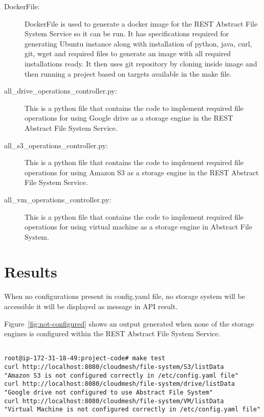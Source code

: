 \begin{description}
\item[DockerFile:]


  DockerFile is used to generate a docker image for the REST Abstract
  File System Service so it can be run.  It has specifications required for
  generating Ubuntu instance along with installation of python, java,
  curl, git, wget and required files to generate an image with all
  required installations ready. It then uses git repository by cloning
  inside image and then running a project based on targets available
  in the make file.

\item[all\_drive\_operations\_controller.py:] This is a python file
  that contains the code to implement required file operations for
  using Google drive as a storage engine in the REST Abstract File
  System Service.

\item[all\_s3\_operations\_controller.py:] This is a python file that
  contains the code to implement required file operations for using
  Amazon S3 as a storage engine in the REST Abstract File System
  Service.

\item[all\_vm\_operations\_controller.py:]

This is a python file that contains the code to implement required file 
operations for using virtual machine as a storage engine in Abstract File 
System. 

\end{description}



\section{Results}

When no configurations present in config.yaml file, no storage 
system will be accessible it will be displayed as message in 
API result.


Figure~\ref{fig:not-configured} shows an output generated when none of
the storage engines is configured within the REST Abstract File System
Service.


\begin{figure*}[!ht]
\begin{footnotesize}
\begin{verbatim}

root@ip-172-31-18-49:project-code# make test
curl http://localhost:8080/cloudmesh/file-system/S3/listData
"Amazon S3 is not configured correctly in /etc/config.yaml file"
curl http://localhost:8080/cloudmesh/file-system/drive/listData
"Google drive not configured to use Abstract File System"
curl http://localhost:8080/cloudmesh/file-system/VM/listData
"Virtual Machine is not configured correctly in /etc/config.yaml file"

\end{verbatim}
\end{footnotesize}
\caption{No storage system configured}\label{fig:not-configured}
\end{figure*}



